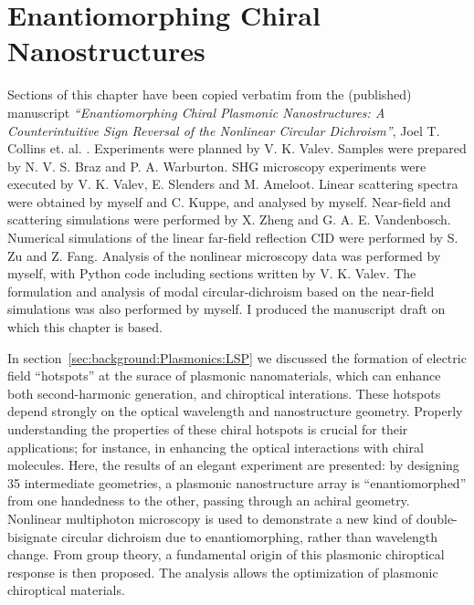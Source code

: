 \chapter{Enantiomorphing Chiral Nanostructures}\label{sec:results:EnantiomorphingChiralCrosses}


Sections of this chapter have been copied verbatim from the (published) manuscript \textit{``Enantiomorphing Chiral Plasmonic Nanostructures: A Counterintuitive Sign Reversal of the Nonlinear Circular Dichroism''}, Joel T. Collins et. al. \cite{Collins2018}. 
Experiments were planned by V. K. Valev. Samples were prepared by N. V. S. Braz and P. A. Warburton. SHG microscopy experiments were executed by V. K. Valev, E. Slenders and M. Ameloot. Linear scattering spectra were obtained by myself and C. Kuppe, and analysed by myself. Near-field and scattering simulations were performed by X. Zheng and G. A. E. Vandenbosch. Numerical simulations of the linear far-field reflection CID were performed by S. Zu and Z. Fang. 
Analysis of the nonlinear microscopy data was performed by myself, with Python code including sections written by V. K. Valev. The formulation and analysis of modal circular-dichroism based on the near-field simulations was also performed by myself. I produced the manuscript draft on which this chapter is based. 

\bigskip \noindent
In section~\ref{sec:background:Plasmonics:LSP} we discussed the formation of electric field ``hotspots'' at the surace of plasmonic nanomaterials, which can enhance both second-harmonic generation, and chiroptical interations. These hotspots depend strongly on the optical wavelength and nanostructure geometry.
Properly understanding the properties of these chiral hotspots is crucial for their applications; for instance, in enhancing the optical interactions with chiral molecules. 
Here, the results of an elegant experiment are presented: by designing 35 intermediate geometries, a plasmonic nanostructure array is ``enantiomorphed'' from one handedness to the other, passing through an achiral geometry. 
Nonlinear multiphoton microscopy is used to demonstrate a new kind of double-bisignate circular dichroism due to enantiomorphing, rather than wavelength change.
From group theory, a fundamental origin of this plasmonic chiroptical response is then proposed. The analysis allows the optimization of plasmonic chiroptical materials.

